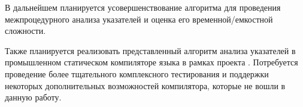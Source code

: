 \documentclass[14pt,titlepage,draft]{extarticle}
\newcommand{\java}{\eng{Java}\xspace}
\begin{document}
    В дальнейшем планируется усовершенствование алгоритма для проведения
    межпроцедурного анализа указателей и оценка его временной/емкостной
    сложности.

    Также планируется реализовать представленный алгоритм анализа
    указателей в промышленном статическом компиляторе языка \java в
    рамках проекта . Потребуется проведение более
    тщательного комплексного тестирования и поддержки некоторых дополнительных
    возможностей компилятора, которые не вошли в данную работу.

  
  
\end{document}
